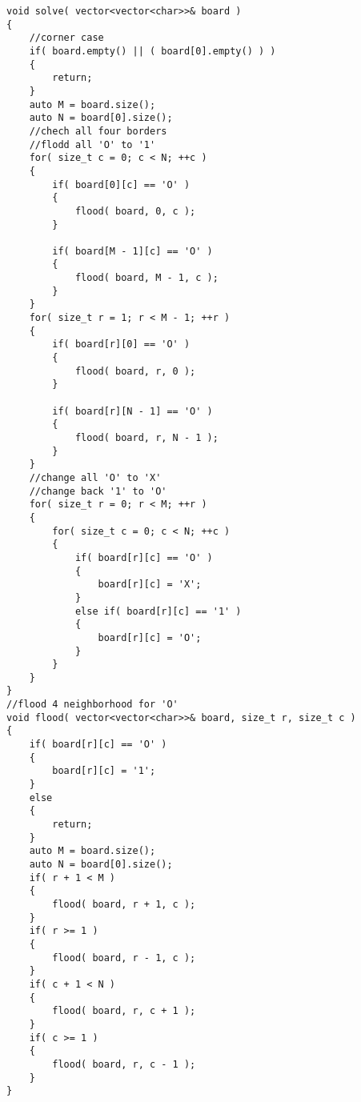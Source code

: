 \setcounter{lstlisting}{0}
\begin{lstlisting}[style=customc, caption={Border Change First}]
void solve( vector<vector<char>>& board )
{
    //corner case
    if( board.empty() || ( board[0].empty() ) )
    {
        return;
    }
    auto M = board.size();
    auto N = board[0].size();
    //chech all four borders
    //flodd all 'O' to '1'
    for( size_t c = 0; c < N; ++c )
    {
        if( board[0][c] == 'O' )
        {
            flood( board, 0, c );
        }

        if( board[M - 1][c] == 'O' )
        {
            flood( board, M - 1, c );
        }
    }
    for( size_t r = 1; r < M - 1; ++r )
    {
        if( board[r][0] == 'O' )
        {
            flood( board, r, 0 );
        }

        if( board[r][N - 1] == 'O' )
        {
            flood( board, r, N - 1 );
        }
    }
    //change all 'O' to 'X'
    //change back '1' to 'O'
    for( size_t r = 0; r < M; ++r )
    {
        for( size_t c = 0; c < N; ++c )
        {
            if( board[r][c] == 'O' )
            {
                board[r][c] = 'X';
            }
            else if( board[r][c] == '1' )
            {
                board[r][c] = 'O';
            }
        }
    }
}
//flood 4 neighborhood for 'O'
void flood( vector<vector<char>>& board, size_t r, size_t c )
{
    if( board[r][c] == 'O' )
    {
        board[r][c] = '1';
    }
    else
    {
        return;
    }
    auto M = board.size();
    auto N = board[0].size();
    if( r + 1 < M )
    {
        flood( board, r + 1, c );
    }
    if( r >= 1 )
    {
        flood( board, r - 1, c );
    }
    if( c + 1 < N )
    {
        flood( board, r, c + 1 );
    }
    if( c >= 1 )
    {
        flood( board, r, c - 1 );
    }
}
\end{lstlisting}